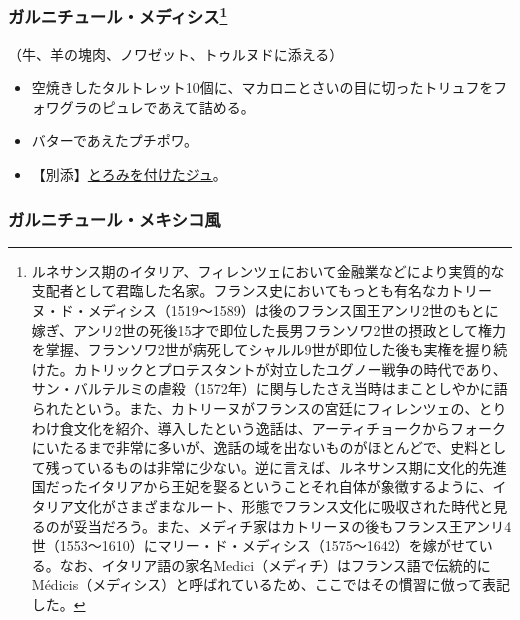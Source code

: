 \begin{recette}
{\subsubsection[ガルニチュール・メディシス]{\texorpdfstring{ガルニチュール・メディシス\footnote{ルネサンス期のイタリア、フィレンツェにおいて金融業などにより実質的な支配者として君臨した名家。フランス史においてもっとも有名なカトリーヌ・ド・メディシス（1519〜1589）は後のフランス国王アンリ2世のもとに嫁ぎ、アンリ2世の死後15才で即位した長男フランソワ2世の摂政として権力を掌握、フランソワ2世が病死してシャルル9世が即位した後も実権を握り続けた。カトリックとプロテスタントが対立したユグノー戦争の時代であり、サン・バルテルミの虐殺（1572年）に関与したさえ当時はまことしやかに語られたという。また、カトリーヌがフランスの宮廷にフィレンツェの、とりわけ食文化を紹介、導入したという逸話は、アーティチョークからフォークにいたるまで非常に多いが、逸話の域を出ないものがほとんどで、史料として残っているものは非常に少ない。逆に言えば、ルネサンス期に文化的先進国だったイタリアから王妃を娶るということそれ自体が象徴するように、イタリア文化がさまざまなルート、形態でフランス文化に吸収された時代と見るのが妥当だろう。また、メディチ家はカトリーヌの後もフランス王アンリ4世（1553〜1610）にマリー・ド・メディシス（1575〜1642）を嫁がせている。なお、イタリア語の家名Medici（メディチ）はフランス語で伝統的にMédicis（メディシス）と呼ばれているため、ここではその慣習に倣って表記した。}}{ガルニチュール・メディシス}}\label{garniture-medicis}}



（牛、羊の塊肉、ノワゼット、トゥルヌドに添える）

\begin{itemize}
\item
  空焼きしたタルトレット10個に、マカロニとさいの目に切ったトリュフをフォワグラのピュレであえて詰める。
\item
  バターであえたプチポワ。
\item
  【別添】\protect\hyperlink{jus-de-veau-lie}{とろみを付けたジュ}。
\end{itemize}

\atoaki{}

\hypertarget{garniture-a-la-mexicaine}{%
\subsubsection{ガルニチュール・メキシコ風}\label{garniture-a-la-mexicaine}}


\end{recette}
